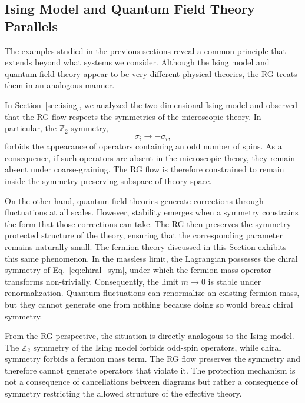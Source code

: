 \documentclass[a4paper, 11pt]{article}
\begin{document}
\subsection{Ising Model and Quantum Field Theory Parallels}
\label{sec:pattern}

The examples studied in the previous sections reveal a common principle that extends beyond what systems we consider. Although the Ising model and quantum field theory appear to be very different physical theories, the RG treats them in an analogous manner.

In Section~\ref{sec:ising}, we analyzed the two-dimensional Ising model and observed that the RG flow respects the symmetries of the microscopic theory. In particular, the $\mathbb{Z}_2$ symmetry,
\begin{equation*}
\sigma_i \rightarrow -\sigma_i ,
\end{equation*}
forbids the appearance of operators containing an odd number of spins. As a consequence, if such operators are absent in the microscopic theory, they remain absent under coarse-graining. The RG flow is therefore constrained to remain inside the symmetry-preserving subspace of theory space.

On the other hand, quantum field theories generate corrections through fluctuations at all scales. However, stability emerges when a symmetry constrains the form that those corrections can take. The RG then preserves the symmetry-protected structure of the theory, ensuring that the corresponding parameter remains naturally small. The fermion theory discussed in this Section exhibits this same phenomenon. In the massless limit, the Lagrangian possesses the chiral symmetry of Eq.~\eqref{eq:chiral_sym}, under which the fermion mass operator transforms non-trivially. Consequently, the limit $m\rightarrow0$ is stable under renormalization. Quantum fluctuations can renormalize an existing fermion mass, but they cannot generate one from nothing because doing so would break chiral symmetry.

From the RG perspective, the situation is directly analogous to the Ising model. The $\mathbb{Z}_2$ symmetry of the Ising model forbids odd-spin operators, while chiral symmetry forbids a fermion mass term. The RG flow preserves the symmetry and therefore cannot generate operators that violate it. The protection mechanism is not a consequence of cancellations between diagrams but rather a consequence of symmetry restricting the allowed structure of the effective theory.
\end{document}
